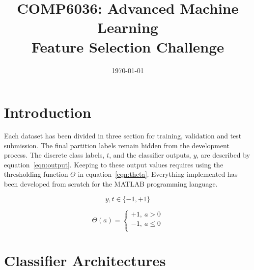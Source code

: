 \documentclass{ecsarticle}     %
\begin{document}
\frontmatter
\title      {COMP6036: Advanced Machine Learning\\
            Feature Selection Challenge}
      
\addresses  {\deptname\\\univname}

\date       {\today}
\subject    {}
\keywords   {}
\maketitle


\begin{abstract}
\end{abstract}

\mainmatter


\section{Introduction}

Each dataset has been divided in three section for training, validation and test submission.
The final partition labels remain hidden from the development process.
The discrete class labels, $t$, and the classifier outputs, $y$, are described by equation~\eqref{eqn:output}.
Keeping to these output values requires using the thresholding function $\Theta$ in equation~\eqref{eqn:theta}. 
Everything implemented has been developed from scratch for the MATLAB programming language. 


\begin{equation}
	y,t \in \{-1,+1\}
	\label{eqn:output}
\end{equation}

\begin{equation}
	\Theta(a) = \left\{ 
      \begin{array}{l}
         +1,\:a > 0\\
         -1,\:a \leq 0\\
      \end{array} \right.	
	\label{eqn:theta}
\end{equation}

\section{Classifier Architectures}
\end{document}
